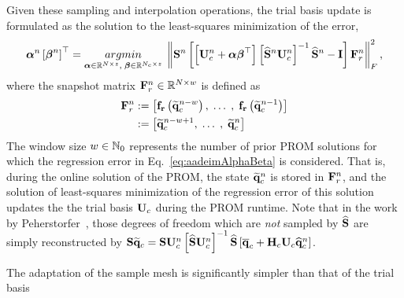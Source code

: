 Given these sampling and interpolation operations, the trial basis update is formulated as the solution to the least-squares minimization of the error,
%
\begin{equation}\label{eq:aadeimAlphaBeta}
	\adeimAlpha^{\timeIdx} \left[\adeimBeta^{\timeIdx}\right]^\top = \argmin{\adeimAlpha \inRTwo{\numDOF}{\numRank},\; \adeimBeta \inRTwo{\numConsModes}{\numRank}} \left\Vert \sampMat^{\timeIdx} \left[\left[\consTrial^{\timeIdx} + \adeimAlpha \adeimBeta^\top \right] \left[\sampMatInterp^{\timeIdx} \consTrial^{\timeIdx}\right]^{-1} \sampMatInterp^{\timeIdx} - \identMat \right] \resWindow^{\timeIdx} \right\Vert_F^2,
\end{equation}
%
where the snapshot matrix $\resWindow^{\timeIdx} \inRTwo{\numDOF}{\numWindow}$ is defined as
%
\begin{align}
	\resWindow^{\timeIdx} &\defEq \left[\rhsResFunc{\consVecRom^{\timeIdx - \numWindow}}, \; \hdots \;, \; \rhsResFunc{\consVecRom^{\timeIdx - 1}}\right] \\
	&\defEq \left[\consVecRom^{\timeIdx - \numWindow + 1}, \; \hdots \;, \; \consVecRom^{\timeIdx} \right]
\end{align}
%
The window size $w \in \mathbb{N}_0$ represents the number of prior PROM solutions for which the regression error in Eq.~\ref{eq:aadeimAlphaBeta} is considered. That is, during the online solution of the PROM, the state $\mathbf{\widetilde{q}}_{c}^{n}$ is stored in $\resWindow^{\timeIdx}$, and the solution of least-squares minimization of the regression error of this solution updates the the trial basis $\consTrial$ during the PROM runtime. Note that in the work by Peherstorfer~\cite{Peherstorfer2020Adaptive}, those degrees of freedom which are \textit{not} sampled by $\mathbf{\widehat{S}}$ are simply reconstructed by $\sampMat \consVecRom = \sampMat \consTrial^{\timeIdx} \left[\sampMatInterp \consTrial^{\timeIdx}\right]^{-1} \sampMatInterp \left[\consVecCent + \consScale \consTrial \consVecCoef^{\timeIdx}\right]$.

The adaptation of the sample mesh is significantly simpler than that of the trial basis

